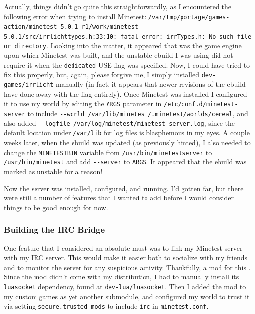 \documentclass{article}
\begin{document}
Actually, things didn't go quite this straightforwardly, as I encountered the following error when trying to install Minetest: \verb|/var/tmp/portage/games-action/minetest-5.0.1-r1/work/minetest-5.0.1/src/irrlichttypes.h:33:10: fatal error: irrTypes.h: No such file or directory|.  Looking into the matter, it appeared that  was the game engine upon which Minetest was built, and the unstable ebuild I was using did not require it when the \texttt{dedicated} USE flag was specified.  Now, I could have tried to fix this properly, but, again, please forgive me, I simply installed \texttt{dev-games/irrlicht} manually (in fact, it appears that newer revisions of the ebuild have done away with the flag entirely).  Once Minetest was installed I configured it to use my world by editing the \texttt{ARGS} parameter in \texttt{/etc/conf.d/minetest-server} to include \verb|--world /var/lib/minetest/.minetest/worlds/cereal|, and also added \verb|--logfile /var/log/minetest/minetest-server.log|, since the default location under \texttt{/var/lib} for log files is blasphemous in my eyes.  A couple weeks later, when the ebuild was updated (as previously hinted), I also needed to change the \texttt{MINETESTBIN} variable from \texttt{/usr/bin/minetestserver} to \texttt{/usr/bin/minetest} and add \verb|--server| to \texttt{ARGS}.  It appeared that the ebuild was marked as unstable for a reason!

Now the server was installed, configured, and running.  I'd gotten far, but there were still a number of features that I wanted to add before I would consider things to be good enough for now.

\subsubsection{Building the IRC Bridge}
One feature that I considered an absolute must was to link my Minetest server with my IRC server.  This would make it easier both to socialize with my friends and to monitor the server for any suspicious activity.  Thankfully, a mod for this .  Since the mod didn't come with my distribution, I had to manually install its \texttt{luasocket} dependency, found at \texttt{dev-lua/luasocket}.  Then I added the mod to my custom games as yet another submodule, and configured my world to trust it via setting \texttt{secure.trusted_mods} to include \texttt{irc} in \texttt{minetest.conf}.
\end{document}
